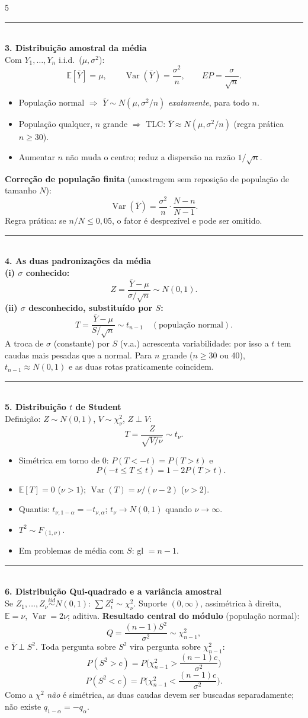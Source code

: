 \documentclass[a4paper,8pt]{extarticle}
\newcommand{\tit}[1]{\vspace{2pt}\textcolor{azul}{\rule{\linewidth}{0.6pt}}\\[1pt]\textbf{\textcolor{azul}{#1}}\\[1pt]}
\newcommand{\E}{\mathbb{E}}
\newcommand{\Var}{\operatorname{Var}}
\newcommand{\ind}{\stackrel{iid}{\sim}}
\begin{document}
\begin{multicols*}{5}
\tit{3. Distribuição amostral da média}
Com $Y_1,\dots,Y_n$ i.i.d.\ ($\mu,\sigma^2$):
\[\E[\bar Y]=\mu,\qquad \Var(\bar Y)=\frac{\sigma^2}{n},\qquad EP=\frac{\sigma}{\sqrt n}.\]
\begin{itemize}
\item População normal $\Rightarrow$ $\bar Y\sim N(\mu,\sigma^2/n)$ \emph{exatamente}, para todo $n$.
\item População qualquer, $n$ grande $\Rightarrow$ TLC: $\bar Y\approx N(\mu,\sigma^2/n)$ (regra prática $n\ge30$).
\item Aumentar $n$ não muda o centro; reduz a dispersão na razão $1/\sqrt n$.
\end{itemize}
\textbf{Correção de população finita} (amostragem sem reposição de população de tamanho $N$):
\[\Var(\bar Y)=\frac{\sigma^2}{n}\cdot\frac{N-n}{N-1}.\]
Regra prática: se $n/N\le 0{,}05$, o fator é desprezível e pode ser omitido.

\tit{4. As duas padronizações da média}
\textbf{(i) $\sigma$ conhecido:}
\[Z=\frac{\bar Y-\mu}{\sigma/\sqrt n}\sim N(0,1).\]
\textbf{(ii) $\sigma$ desconhecido, substituído por $S$:}
\[T=\frac{\bar Y-\mu}{S/\sqrt n}\sim t_{n-1}\quad(\text{população normal}).\]
A troca de $\sigma$ (constante) por $S$ (v.a.) acrescenta variabilidade: por isso a $t$ tem caudas mais pesadas que a normal. Para $n$ grande ($n\ge30$ ou 40), $t_{n-1}\approx N(0,1)$ e as duas rotas praticamente coincidem.

\tit{5. Distribuição $t$ de Student}
Definição: $Z\sim N(0,1)$, $V\sim\chi^2_\nu$, $Z\perp V$:
\[T=\frac{Z}{\sqrt{V/\nu}}\sim t_\nu .\]
\begin{itemize}
\item Simétrica em torno de 0: $P(T<-t)=P(T>t)$ e
\[P(-t\le T\le t)=1-2P(T>t).\]
\item $\E[T]=0$ ($\nu>1$); $\Var(T)=\nu/(\nu-2)$ ($\nu>2$).
\item Quantis: $t_{\nu,1-\alpha}=-t_{\nu,\alpha}$; $t_\nu\to N(0,1)$ quando $\nu\to\infty$.
\item $T^2\sim F_{(1,\nu)}$.
\item Em problemas de média com $S$: gl $=n-1$.
\end{itemize}

\tit{6. Distribuição Qui-quadrado e a variância amostral}
Se $Z_1,\dots,Z_\nu\ind N(0,1)$: $\sum Z_i^2\sim\chi^2_\nu$. Suporte $(0,\infty)$, assimétrica à direita, $\E=\nu$, $\Var=2\nu$; aditiva.
\textbf{Resultado central do módulo} (população normal):
\[Q=\frac{(n-1)S^2}{\sigma^2}\sim \chi^2_{n-1},\]
e $\bar Y\perp S^2$. Toda pergunta sobre $S^2$ vira pergunta sobre $\chi^2_{n-1}$:
\[P(S^2>c)=P\!\Big(\chi^2_{n-1}>\frac{(n-1)c}{\sigma^2}\Big)\]
\[P(S^2<c)=P\!\Big(\chi^2_{n-1}<\frac{(n-1)c}{\sigma^2}\Big).\]
Como a $\chi^2$ \emph{não} é simétrica, as duas caudas devem ser buscadas separadamente; não existe $q_{1-\alpha}=-q_\alpha$.


\end{multicols*}
\end{document}
